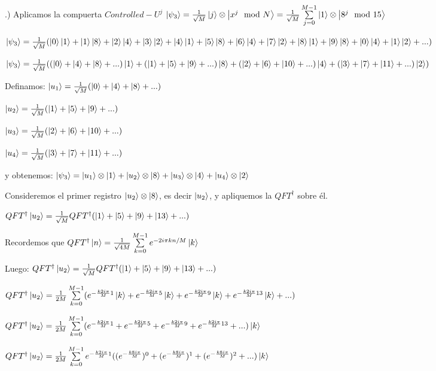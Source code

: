 .) Aplicamos la compuerta $Controlled-U^j$ $\ket{\psi_3} = \frac{1}{\sqrt{M}} \ket{j} \otimes \ket{x^j \mod N} = \frac{1}{\sqrt{M}} \sum\limits_{j=0}^{M-1} \ket{1} \otimes \ket{8^j \mod 15}$

$\ket{\psi_3} = \frac{1}{\sqrt{M}} (\ket{0}\ket{1} + \ket{1}\ket{8} + \ket{2}\ket{4} + \ket{3}\ket{2} + \ket{4}\ket{1} + \ket{5}\ket{8} + \ket{6}\ket{4} + \ket{7}\ket{2} + \ket{8}\ket{1} + \ket{9}\ket{8} + \ket{0}\ket{4} + \ket{1}\ket{2} + ...)$

$\ket{\psi_3} = \frac{1}{\sqrt{M}} ((\ket{0} + \ket{4} + \ket{8} + ...)\ket{1} + (\ket{1} + \ket{5} + \ket{9} + ...) \ket{8} + (\ket{2} + \ket{6} + \ket{10} + ...) \ket{4} + (\ket{3} + \ket{7} + \ket{11} + ...) \ket{2})$

Definamos: $\ket{u_1} = \frac{1}{\sqrt{M}} (\ket{0} + \ket{4} + \ket{8} + ...)$

$\ket{u_2} = \frac{1}{\sqrt{M}} (\ket{1} + \ket{5} + \ket{9} + ...)$

$\ket{u_3} = \frac{1}{\sqrt{M}} (\ket{2} + \ket{6} + \ket{10} + ...)$

$\ket{u_4} = \frac{1}{\sqrt{M}} (\ket{3} + \ket{7} + \ket{11} + ...)$

y obtenemos: $\ket{\psi_3} = \ket{u_1} \otimes \ket{1} + \ket{u_2} \otimes \ket{8} + \ket{u_3} \otimes \ket{4} + \ket{u_4} \otimes \ket{2}$

Consideremos el primer registro $\ket{u_2} \otimes \ket{8}$, es decir $\ket{u_2}$, y apliquemos la $QFT^\dagger$ sobre él.

$QFT^\dagger \ket{u_2} = \frac{1}{\sqrt{M}} QFT^\dagger (\ket{1} + \ket{5} + \ket{9} + \ket{13} + ...)$

Recordemos que $QFT^\dagger \ket{n} = \frac{1}{\sqrt{4 M}} \sum\limits_{k=0}^{M-1} e^{-2 i \pi k n /M} \ket{k}$

Luego: $QFT^\dagger \ket{u_2} = \frac{1}{\sqrt{M}} QFT^\dagger (\ket{1} + \ket{5} + \ket{9} + \ket{13} + ...)$

$QFT^\dagger \ket{u_2} = \frac{1}{2M} \sum\limits_{k=0}^{M-1} (e^{- \frac{k 2 i \pi}{M} 1} \ket{k} + e^{- \frac{k 2 i \pi}{M} 5} \ket{k} + e^{- \frac{k 2 i \pi}{M} 9} \ket{k} + e^{- \frac{k 2 i \pi}{M} 13} \ket{k} + ...)$


$QFT^\dagger \ket{u_2} = \frac{1}{2M} \sum\limits_{k=0}^{M-1} (e^{- \frac{k 2 i \pi}{M} 1} + e^{- \frac{k 2 i \pi}{M} 5} + e^{- \frac{k 2 i \pi}{M} 9} + e^{- \frac{k 2 i \pi}{M} 13} + ...) \ket{k}$

$QFT^\dagger \ket{u_2} = \frac{1}{2M} \sum\limits_{k=0}^{M-1} e^{- \frac{k 2 i \pi}{M} 1} ((e^{- \frac{k 8 i \pi}{M}})^0 + (e^{- \frac{k 8 i \pi}{M}})^1 + (e^{- \frac{k 8 i \pi}{M}})^2 + ...) \ket{k}$

